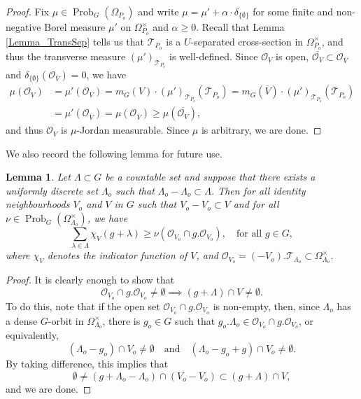 \documentclass[12pt,reqno,a4paper]{amsart}
\numberwithin{equation}{section}
\newcommand{\cO}{\mathcal{O}}
\newcommand{\cT}{\mathcal{T}}
\newcommand{\qand}{\quad \textrm{and} \quad}
\DeclareMathOperator{\Prob}{Prob}
\theoremstyle{theorem}
\newtheorem{lemma}[theorem]{Lemma}
\theoremstyle{task}
\theoremstyle{definition}
\begin{document}
\begin{proof}
Fix $\mu \in \Prob_G(\Omega_{P_o})$ and write $\mu = \mu' + \alpha \cdot 
\delta_{\{\emptyset\}}$ for some finite and non-negative Borel measure $\mu'$ on $\Omega_{P_o}^{\times}$ and $\alpha \geq 0$. Recall that Lemma \ref{Lemma_TransSep} tells us that $\cT_{P_o}$ is a $U$-separated cross-section in $\Omega_{P_o}^{\times}$, and thus the transverse measure $(\mu')_{\cT_{P_o}}$ is well-defined. Since $\cO_V$ is open, $\overline{\cO_V} \subset \cO_{\overline{V}}$ and $\delta_{\{\emptyset\}}(\cO_{\overline{V}}) = 0$, we have
\begin{align*}
\mu(\cO_V) &= \mu'(\cO_V) 
= m_G(V) \cdot (\mu')_{\cT_{P_o}}(\cT_{P_o}) = 
m_G(\overline{V}) \cdot (\mu')_{\cT_{P_o}}(\cT_{P_o}) \\[0.2cm]
&= \mu'(\cO_{\overline{V}}) = \mu(\cO_{\overline{V}}) \geq \mu(\overline{\cO_V}),
\end{align*}
and thus $\cO_V$ is $\mu$-Jordan measurable. Since $\mu$ is arbitrary, we are done.
\end{proof}

We also record the following lemma for future use. 

\begin{lemma}
\label{Lemma_lwbndnu}
Let $\Lambda \subset G$ be a countable set and suppose that there exists a uniformly discrete set $\Lambda_o$ such that $\Lambda_o - \Lambda_o \subset \Lambda$. Then for all identity neighbourhoods $V_o$ and $V$ 
in $G$ such that $V_o - V_o \subset V$ and for all $\nu \in \Prob_G(\Omega^{\times}_{\Lambda_o})$, we have
\[
\sum_{\lambda \in \Lambda} \chi_V(g+\lambda) \geq \nu(\cO_{V_o} \cap g.\cO_{V_o}), \quad \textrm{for all $g \in G$},
\]
where $\chi_V$ denotes the indicator function of $V$, and $\cO_{V_o} = (-V_o).\cT_{\Lambda_o} \subset \Omega_{\Lambda_o}^{\times}$.
\end{lemma}

\begin{proof}
It is clearly enough to show that 
\[
\cO_{V_o} \cap g.\cO_{V_o} \neq \emptyset \implies (g + \Lambda) \cap V \neq \emptyset. 
\]
To do this, note that if the open set $\cO_{V_o} \cap g.\cO_{V_o}$ is non-empty, then, since $\Lambda_o$ has a dense $G$-orbit in $\Omega_{\Lambda_o}^{\times}$, there is $g_o \in G$ such that
$g_o.\Lambda_o \in \cO_{V_o} \cap g.\cO_{V_o}$, or equivalently,
\[
(\Lambda_o - g_o) \cap V_o \neq \emptyset \qand (\Lambda_o - g_o+g) \cap V_o \neq \emptyset.
\]
By taking difference, this implies that 
\[
\emptyset \neq (g + \Lambda_o - \Lambda_o) \cap (V_o - V_o) \subset (g + \Lambda) \cap V,
\]
and we are done.
\end{proof}
\end{document}
